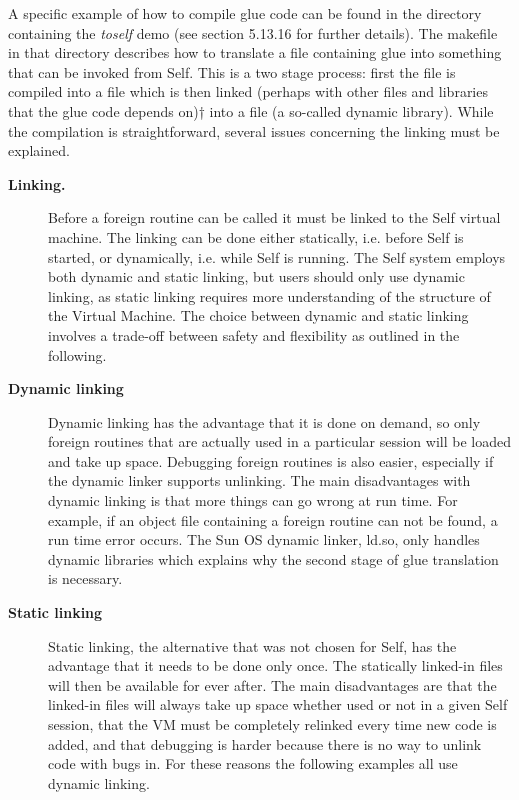 \documentclass[letterpaper,10pt,english]{sphinxmanual}
\begin{document}
A specific example of how to compile glue code can be found in the directory containing the \emph{toself}
demo (see section 5.13.16 for further details). The makefile in that directory describes how to
translate a  file containing glue into something that can be invoked from Self. This is a two
stage process: first the  file is compiled into a  file which is then linked (perhaps with other
 files and libraries that the glue code depends on)† into a  file (a so-called dynamic library).
While the compilation is straightforward, several issues concerning the linking must be explained.
\begin{description}
\item[{\textbf{Linking.}}] \leavevmode
Before a foreign routine can be called it must be linked to the Self virtual machine. The
linking can be done either statically, i.e. before Self is started, or dynamically, i.e. while Self is
running. The Self system employs both dynamic and static linking, but users should only use dynamic
linking, as static linking requires more understanding of the structure of the Virtual Machine.
The choice between dynamic and static linking involves a trade-off between safety and
flexibility as outlined in the following.

\item[{\textbf{Dynamic linking}}] \leavevmode
Dynamic linking has the advantage that it is done on demand, so only foreign routines that are actually
used in a particular session will be loaded and take up space. Debugging foreign routines is
also easier, especially if the dynamic linker supports unlinking. The main disadvantages with dynamic
linking is that more things can go wrong at run time. For example, if an object file containing
a foreign routine can not be found, a run time error occurs. The Sun OS dynamic linker, ld.so,
only handles dynamic libraries which explains why the second stage of glue translation is necessary.

\item[{\textbf{Static linking}}] \leavevmode
Static linking, the alternative that was not chosen for Self, has the advantage that it needs to be
done only once. The statically linked-in files will then be available for ever after. The main disadvantages
are that the linked-in files will always take up space whether used or not in a given Self
session, that the VM must be completely relinked every time new code is added, and that debugging
is harder because there is no way to unlink code with bugs in. For these reasons the following
examples all use dynamic linking.

\end{description}
\end{document}
